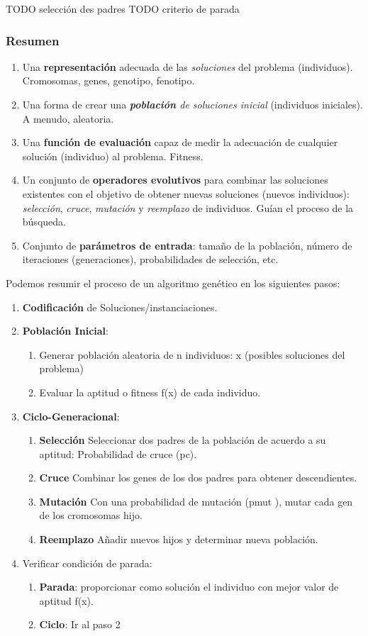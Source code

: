 TODO selección des padres
TODO criterio de parada

\subsubsection{Resumen}
\begin{enumerate}
	\item Una \textbf{representación} adecuada de las \textit{soluciones} del problema (individuos).\\
   Cromosomas, genes, genotipo, fenotipo.
	\item Una forma de crear una \textit{\textbf{población} de soluciones inicial} (individuos iniciales). A
menudo, aleatoria.
	\item Una \textbf{función de evaluación} capaz de medir la adecuación de cualquier solución
	(individuo) al problema. Fitness.
	\item Un conjunto de \textbf{operadores evolutivos} para combinar las soluciones existentes con el
objetivo de obtener nuevas soluciones (nuevos individuos): \textit{selección}, \textit{cruce}, \textit{mutación} y \textit{reemplazo} de individuos. Guían el proceso de la búsqueda.
	\item Conjunto de \textbf{parámetros de entrada}: tamaño de la población, número de iteraciones
	(generaciones), probabilidades de selección, etc.
\end{enumerate}


Podemos resumir el proceso de un algoritmo genético en los siguientes pasos:
\begin{enumerate}
	\item \textbf{Codificación} de Soluciones/instanciaciones.
	\item \textbf{Población Inicial}:
	\begin{enumerate}
      \item Generar población aleatoria de n individuos: {x} (posibles soluciones del problema)
      \item Evaluar la aptitud o fitness f(x) de cada individuo.
   \end{enumerate}
	\item \textbf{Ciclo-Generacional}:
	\begin{enumerate}
   	\item \textbf{Selección} Seleccionar dos padres de la población de acuerdo a su aptitud:
Probabilidad de cruce (pc).
	\item \textbf{Cruce} Combinar los genes de los dos padres para obtener descendientes.
	\item \textbf{Mutación} Con una probabilidad de mutación (pmut ), mutar cada gen de los
cromosomas hijo.
	\item \textbf{Reemplazo} Añadir nuevos hijos y determinar nueva población.
   \end{enumerate}
	\item Verificar condición de parada:
	\begin{enumerate}
   	\item \textbf{Parada}: proporcionar como solución el individuo con mejor valor de aptitud f(x).
	\item \textbf{Ciclo}: Ir al paso 2
   \end{enumerate}
\end{enumerate}